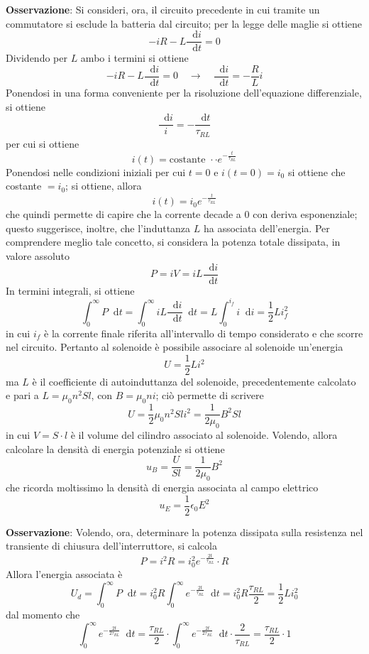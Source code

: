 \documentclass[a4paper]{extarticle}
\newcommand\dif{\mathop{}\!\mathrm{d}}
\begin{document}
\vspace{2em}
\noindent
\textbf{Osservazione}: Si consideri, ora, il circuito precedente in cui tramite un commutatore si esclude la batteria dal circuito; per la legge delle maglie si ottiene
\[-iR - L \dfrac{\dif i}{\dif t} = 0\]
Dividendo per $L$ ambo i termini si ottiene
\[-iR - L \dfrac{\dif i}{\dif t} = 0 \hspace{1em} \rightarrow \hspace{1em} \dfrac{\dif i}{\dif t} = - \dfrac{R}{L} i\]
Ponendosi in una forma conveniente per la risoluzione dell'equazione differenziale, si ottiene
\[\dfrac{\dif i}{i} = - \dfrac{\dif t}{\tau_{RL}}\]
per cui si ottiene
\[i(t) = \text{costante } \cdot \cdot e^{-\frac{t}{\tau_{RL}}}\]
Ponendosi nelle condizioni iniziali per cui $t=0$ e $i(t=0)=i_0$ si ottiene che costante $=i_0$; si ottiene, allora
\[i(t)=i_0 e^{-\frac{t}{\tau_{RL}}}\]
che quindi permette di capire che la corrente decade a $0$ con deriva esponenziale; questo suggerisce, inoltre, che l'induttanza $L$ ha associata dell'energia. Per comprendere meglio tale concetto, si considera la potenza totale dissipata, in valore assoluto
\[P=iV=i L \dfrac{\dif i}{\dif t}\]
In termini integrali, si ottiene
\[\int_0^\infty P \dif t = \int_0^\infty i L \dfrac{\dif i}{\dif t} \dif t = L \int_0^{i_f} i \dif i = \dfrac{1}{2} L i_f^2\]
in cui $i_f$ è la corrente finale riferita all'intervallo di tempo considerato e che scorre nel circuito. Pertanto al solenoide è possibile associare al solenoide un'energia
\[U=\frac{1}{2}L i^2\]
ma $L$ è il coefficiente di autoinduttanza del solenoide, precedentemente calcolato e pari a $L=\mu_0 n^2 Sl$, con $B=\mu_0 n i$; ciò permette di scrivere
\[U=\dfrac{1}{2} \mu_0 n^2 Sl i^2 = \frac{1}{2 \mu_0} B^2 Sl\]
in cui $V = S \cdot l$ è il volume del cilindro associato al solenoide. Volendo, allora calcolare la densità di energia potenziale si ottiene
\[u_B=\dfrac{U}{Sl} = \dfrac{1}{2\mu_0} B^2\]
che ricorda moltissimo la densità di energia associata al campo elettrico
\[u_E=\dfrac{1}{2} \epsilon_0 E^2\]

\vspace{2em}
\noindent
\textbf{Osservazione}: Volendo, ora, determinare la potenza dissipata sulla resistenza nel transiente di chiusura dell'interruttore, si calcola
\[P=i^2 R=i_0^2 e^{-\frac{2t}{\tau_{RL}}} \cdot R\]
Allora l'energia associata è
\[U_d = \int_0^\infty P \dif t = i_0^2 R \int_0^\infty e^{-\frac{2t}{\tau_{RL}}} \dif t = i_0^2 R \frac{\tau_{RL}}{2} = \dfrac{1}{2} L i_0^2\]
dal momento che 
\[\int_0^\infty e^{-\frac{2t}{2\tau_{RL}}} \dif t = \dfrac{\tau_{RL}}{2} \cdot \int_0^\infty e^{-\frac{2t}{2\tau_{RL}}} \dif t \cdot \dfrac{2}{\tau_{RL}} = \dfrac{\tau_{RL}}{2} \cdot 1\]
\end{document}
